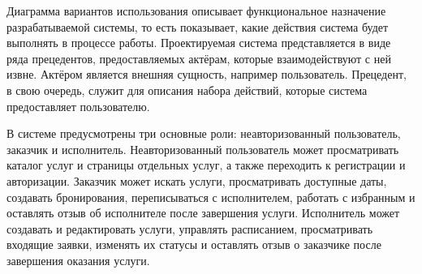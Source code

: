 Диаграмма вариантов использования описывает функциональное назначение разрабатываемой системы, то есть показывает, какие действия система будет выполнять в процессе работы. Проектируемая система представляется в виде ряда прецедентов, предоставляемых актёрам, которые взаимодействуют с ней извне. Актёром является внешняя сущность, например пользователь. Прецедент, в свою очередь, служит для описания набора действий, которые система предоставляет пользователю.

В системе предусмотрены три основные роли: неавторизованный пользователь, заказчик и исполнитель. Неавторизованный пользователь может просматривать каталог услуг и страницы отдельных услуг, а также переходить к регистрации и авторизации. Заказчик может искать услуги, просматривать доступные даты, создавать бронирования, переписываться с исполнителем, работать с избранным и оставлять отзыв об исполнителе после завершения услуги. Исполнитель может создавать и редактировать услуги, управлять расписанием, просматривать входящие заявки, изменять их статусы и оставлять отзыв о заказчике после завершения оказания услуги.

